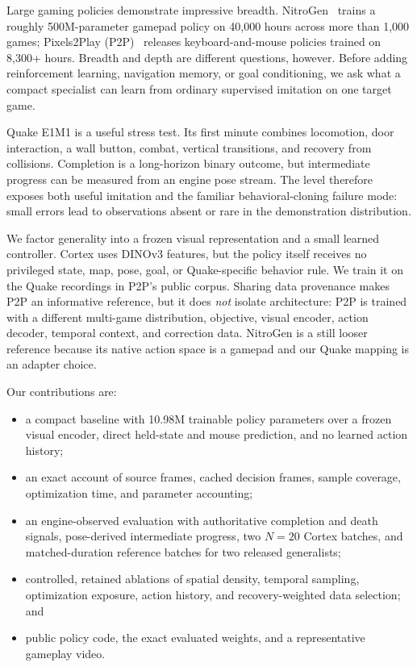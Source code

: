 \documentclass[11pt]{article}
\begin{document}
Large gaming policies demonstrate impressive breadth. NitroGen~\cite{nitrogen} trains a roughly 500M-parameter gamepad policy on 40{,}000 hours across more than 1{,}000 games; Pixels2Play (P2P)~\cite{p2p} releases keyboard-and-mouse policies trained on 8{,}300+ hours. Breadth and depth are different questions, however. Before adding reinforcement learning, navigation memory, or goal conditioning, we ask what a compact specialist can learn from ordinary supervised imitation on one target game.

Quake E1M1 is a useful stress test. Its first minute combines locomotion, door interaction, a wall button, combat, vertical transitions, and recovery from collisions. Completion is a long-horizon binary outcome, but intermediate progress can be measured from an engine pose stream. The level therefore exposes both useful imitation and the familiar behavioral-cloning failure mode: small errors lead to observations absent or rare in the demonstration distribution.

We factor generality into a frozen visual representation and a small learned controller. Cortex uses DINOv3 features, but the policy itself receives no privileged state, map, pose, goal, or Quake-specific behavior rule. We train it on the Quake recordings in P2P's public corpus. Sharing data provenance makes P2P an informative reference, but it does \emph{not} isolate architecture: P2P is trained with a different multi-game distribution, objective, visual encoder, action decoder, temporal context, and correction data. NitroGen is a still looser reference because its native action space is a gamepad and our Quake mapping is an adapter choice.

Our contributions are:
\begin{itemize}
\item a compact baseline with 10.98M trainable policy parameters over a frozen visual encoder, direct held-state and mouse prediction, and no learned action history;
\item an exact account of source frames, cached decision frames, sample coverage, optimization time, and parameter accounting;
\item an engine-observed evaluation with authoritative completion and death signals, pose-derived intermediate progress, two $N{=}20$ Cortex batches, and matched-duration reference batches for two released generalists;
\item controlled, retained ablations of spatial density, temporal sampling, optimization exposure, action history, and recovery-weighted data selection; and
\item public policy code, the exact evaluated weights, and a representative gameplay video.
\end{itemize}
\end{document}
